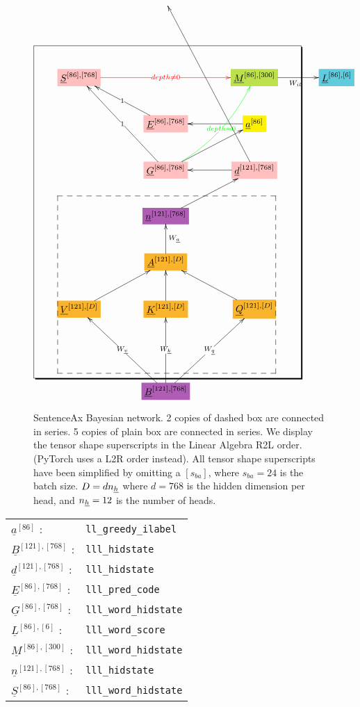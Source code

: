\documentclass[12pt]{article}
\begin{document}
\begin{figure}[h!]\centering
$$\xymatrix@R=2.5pc@C=3.5pc{
&&&
\\
&&&
\\
*+[F*:pink]{\underline{S}^{[86], [768]}}\ar@[red][rr]|-{\color{red} depth\neq 0}&&*+[F*:SpringGreen]{\underline{M}^{[86], [300]}}\ar[r]_{W_{il}}&*+[F*:SkyBlue]{\underline{L}^{[86], [6]}}
\\
&*+[F*:pink]{\underline{E}^{[86], [768]}}\ar[ul]|-{1}&*+[F*:yellow]{\underline{a}^{[86]}}\ar[l]&
\\
&*+[F*:pink]{\underline{G}^{[86], [768]}}\ar[ur]\ar@[green]@/_1pc/[uur]|-{\color{green} depth=0}\ar[uul]|-{1}&*+[F*:pink]{\underline{d}^{[121], [768]}}\ar[uuuul]\ar[l]&
\\
&*+[F*:Orchid]{\underline{n}^{[121], [768]}}\ar[ur]&&
\\
&*+[F*:Dandelion]{\underline{A}^{[121], [D]}}\ar[u]_{W_\rva}&&
\\
*+[F*:Dandelion]{\underline{V}^{[121], [D]}}\ar[ur]&*+[F*:Dandelion]{\underline{K}^{[121], [D]}}\ar[u]&*+[F*:Dandelion]{\underline{Q}^{[121], [D]}}\ar[ul]&
\\
&&&
\\
&*+[F*:Orchid]{\underline{B}^{[121], [768]}}\ar[uu]|-{W_\rvk}\ar[uur]|-{W_\rvq}\ar[uul]|-{W_\rvv}&&
\save
\POS"3,1"."9,1"."3,3"."9,3"!C*+<4.8em>\frm{-,}
\POS"6,1"."9,1"."6,3"."9,3"!C*+<3.8em>\frm{--}
\restore
}$$
\caption{SentenceAx Bayesian network. 2 copies of dashed box are connected in series. 5 copies of plain box are connected in series. We display the tensor shape superscripts in the Linear Algebra R2L order. (PyTorch uses a L2R order instead). All tensor shape superscripts have been simplified by omitting a $[s_{ba}]$, where $s_{ba}=24$ is the batch size. $D= d n_{\underline{h}}$ where $d=768$ is the hidden dimension per head, and $n_{\underline{h}}=12$ is the number of heads. }
\label{fig-texnn-for-sentence-ax-o6-bnet}
\end{figure}

\begin{tabular}{ll}
$\underline{a}^{[86]}$ :&{\tt ll\_greedy\_ilabel}\\
$\underline{B}^{[121], [768]}$ :&{\tt lll\_hidstate}\\
$\underline{d}^{[121], [768]}$ :&{\tt lll\_hidstate}\\
$\underline{E}^{[86], [768]}$ :&{\tt lll\_pred\_code}\\
$\underline{G}^{[86], [768]}$ :&{\tt lll\_word\_hidstate}\\
$\underline{L}^{[86], [6]}$ :&{\tt lll\_word\_score}\\
$\underline{M}^{[86], [300]}$ :&{\tt lll\_word\_hidstate}\\
$\underline{n}^{[121], [768]}$ :&{\tt lll\_hidstate}\\
$\underline{S}^{[86], [768]}$ :&{\tt lll\_word\_hidstate}
\end{tabular}
\end{document}
